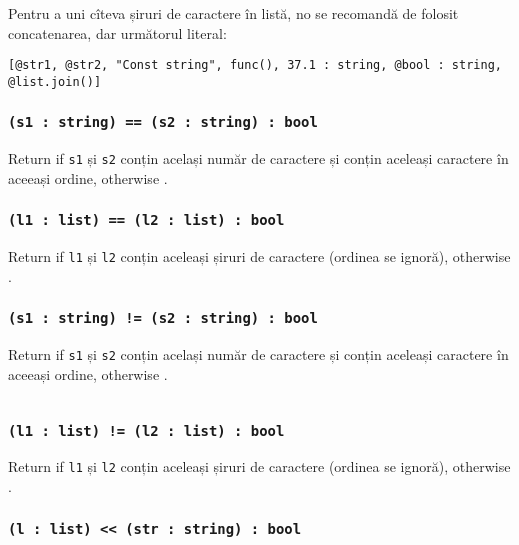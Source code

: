 Pentru a uni cîteva șiruri de caractere în listă, no se recomandă de folosit concatenarea, dar următorul literal:
\begin{verbatim}
[@str1, @str2, "Const string", func(), 37.1 : string, @bool : string, @list.join()]
\end{verbatim}

\subsubsection{\texttt{(s1 : string) == (s2 : string) : bool}}

Return \true{} if \texttt{s1} și \texttt{s2} conțin același număr de caractere și conțin aceleași caractere în aceeași ordine, otherwise \false{}.

\subsubsection{\texttt{(l1 : list) == (l2 : list) : bool}}

Return \true{} if \texttt{l1} și \texttt{l2} conțin aceleași șiruri de caractere (ordinea se ignoră), otherwise \false{}.

\subsubsection{\texttt{(s1 : string) != (s2 : string) : bool}}

Return \false{} if \texttt{s1} și \texttt{s2} conțin același număr de caractere și conțin aceleași caractere în aceeași ordine, otherwise \true{}.

\begin{sourcecode}
    \label{stringlistopex}
    \inputminted[linenos]{icl}{../sources/stringlistopex.icL}
\end{sourcecode}

\subsubsection{\texttt{(l1 : list) != (l2 : list) : bool}}

Return \false{} if \texttt{l1} și \texttt{l2} conțin aceleași șiruri de caractere (ordinea se ignoră), otherwise \true{}.

\subsubsection{\texttt{(l : list) << (str : string) : bool}}

